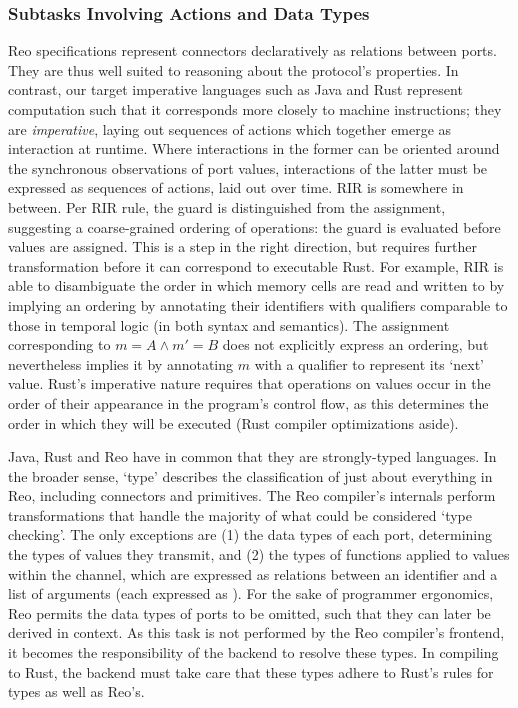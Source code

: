 \subsubsection{Subtasks Involving Actions and Data Types}
Reo specifications represent connectors declaratively as relations between ports. They are thus well suited to reasoning about the protocol's properties. In contrast, our target imperative languages such as Java and Rust represent computation such that it corresponds more closely to machine instructions; they are \textit{imperative}, laying out sequences of actions which together emerge as interaction at runtime. Where interactions in the former can be oriented around the synchronous observations of port values, interactions of the latter must be expressed as sequences of actions, laid out over time. RIR is somewhere in between. Per RIR rule, the guard is distinguished from the assignment, suggesting a coarse-grained ordering of operations: the guard is evaluated before values are assigned. This is a step in the right direction, but requires further transformation before it can correspond to executable Rust. For example, RIR is able to disambiguate the order in which memory cells are read and written to by implying an ordering by annotating their identifiers with qualifiers comparable to those in temporal logic (in both syntax and semantics). The assignment corresponding to $m=A\wedge{}m'=B$ does not explicitly express an ordering, but nevertheless implies it by annotating $m$ with a qualifier to represent its `next' value. Rust's imperative nature requires that operations on values occur in the order of their appearance in the program's control flow, as this determines the order in which they will be executed (Rust compiler optimizations aside).

Java, Rust and Reo have in common that they are strongly-typed languages. In the broader sense, `type' describes the classification of just about everything in Reo, including connectors and primitives. The Reo compiler's internals perform transformations that handle the majority of what could be considered `type checking'. The only exceptions are (1) the data types of each port, determining the types of values they transmit, and (2) the types of functions applied to values within the channel, which are expressed as relations between an identifier and a list of arguments (each expressed as ). For the sake of programmer ergonomics, Reo permits the data types of ports to be omitted, such that they can later be derived in context. As this task is not performed by the Reo compiler's frontend, it becomes the responsibility of the backend to resolve these types. In compiling to Rust, the backend must take care that these types adhere to Rust's rules for types as well as Reo's. 

